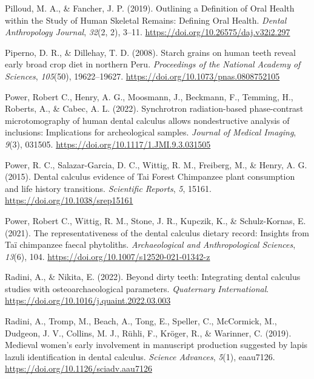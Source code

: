 \documentclass[
  letterpaper,
]{book}
\newlength{\cslhangindent}
\newlength{\cslentryspacingunit} %
\newenvironment{CSLReferences}[2] %
 {%
  \setlength{\parindent}{0pt}
  \ifodd #1
  \let\oldpar\par
  \def\par{\hangindent=\cslhangindent\oldpar}
  \fi
  \setlength{\parskip}{#2\cslentryspacingunit}
 }%
 {}
\begin{document}
\begin{CSLReferences}{1}{0}
\leavevmode{}%
Pilloud, M. A., \& Fancher, J. P. (2019). Outlining a {Definition} of
{Oral Health} within the {Study} of {Human Skeletal Remains}: {Defining
Oral Health}. \emph{Dental Anthropology Journal}, \emph{32}(2, 2),
3--11. \url{https://doi.org/10.26575/daj.v32i2.297}

\leavevmode{}%
Piperno, D. R., \& Dillehay, T. D. (2008). Starch grains on human teeth
reveal early broad crop diet in northern {Peru}. \emph{Proceedings of
the National Academy of Sciences}, \emph{105}(50), 19622--19627.
\url{https://doi.org/10.1073/pnas.0808752105}

\leavevmode{}%
Power, Robert C., Henry, A. G., Moosmann, J., Beckmann, F., Temming, H.,
Roberts, A., \& Cabec, A. L. (2022). Synchrotron radiation-based
phase-contrast microtomography of human dental calculus allows
nondestructive analysis of inclusions: Implications for archeological
samples. \emph{Journal of Medical Imaging}, \emph{9}(3), 031505.
\url{https://doi.org/10.1117/1.JMI.9.3.031505}

\leavevmode{}%
Power, R. C., Salazar-Garcia, D. C., Wittig, R. M., Freiberg, M., \&
Henry, A. G. (2015). Dental calculus evidence of {Tai Forest Chimpanzee}
plant consumption and life history transitions. \emph{Scientific
Reports}, \emph{5}, 15161. \url{https://doi.org/10.1038/srep15161}

\leavevmode{}%
Power, Robert C., Wittig, R. M., Stone, J. R., Kupczik, K., \&
Schulz-Kornas, E. (2021). The representativeness of the dental calculus
dietary record: Insights from {Taï} chimpanzee faecal phytoliths.
\emph{Archaeological and Anthropological Sciences}, \emph{13}(6), 104.
\url{https://doi.org/10.1007/s12520-021-01342-z}

\leavevmode{}%
Radini, A., \& Nikita, E. (2022). Beyond dirty teeth: {Integrating}
dental calculus studies with osteoarchaeological parameters.
\emph{Quaternary International}.
\url{https://doi.org/10.1016/j.quaint.2022.03.003}

\leavevmode{}%
Radini, A., Tromp, M., Beach, A., Tong, E., Speller, C., McCormick, M.,
Dudgeon, J. V., Collins, M. J., Rühli, F., Kröger, R., \& Warinner, C.
(2019). Medieval women's early involvement in manuscript production
suggested by lapis lazuli identification in dental calculus.
\emph{Science Advances}, \emph{5}(1), eaau7126.
\url{https://doi.org/10.1126/sciadv.aau7126}


\end{CSLReferences}
\end{document}
